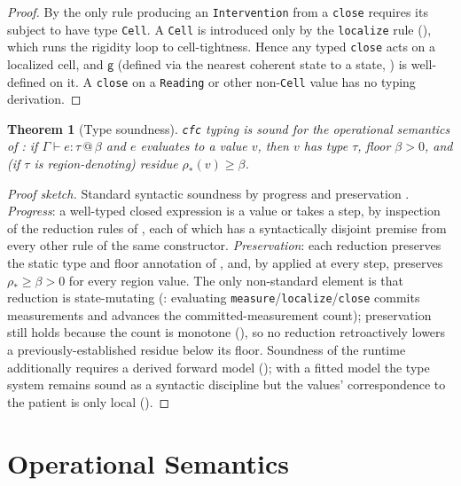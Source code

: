 \documentclass[11pt,a4paper]{article}
\theoremstyle{cfcthm}
\newtheorem{theorem}{Theorem}[section]
\theoremstyle{definition}
\theoremstyle{remark}
\newcommand{\flo}{\beta}                %
\newcommand{\Rd}{\rho}                  %
\newcommand{\gap}{\mathsf{g}}           %
\newcommand{\cf}[1]{\texttt{#1}}
\begin{document}
\begin{proof}
By  the only rule producing an \cf{Intervention} from a
\cf{close} requires its subject to have type \cf{Cell}. A \cf{Cell} is
introduced only by the \cf{localize} rule (), which runs
the rigidity loop to cell-tightness. Hence any typed \cf{close} acts on a
localized cell, and $\gap$ (defined via the nearest coherent state to a state,
) is well-defined on it. A \cf{close} on a \cf{Reading} or other
non-\cf{Cell} value has no typing derivation.
\end{proof}

\begin{theorem}[Type soundness]
\label{thm:soundness}
\cf{cfc} typing is sound for the operational semantics of : if
$\Gamma\vdash e:\tau\,@\,\flo$ and $e$ evaluates to a value $v$, then $v$ has
type $\tau$, floor $\flo>0$, and (if $\tau$ is region-denoting) residue
$\Rd_{\ast}(v)\ge\flo$.
\end{theorem}

\begin{proof}[Proof sketch]
Standard syntactic soundness by progress and preservation
\citep{wright1994syntactic,pierce2002types}. \emph{Progress}: a well-typed
closed expression is a value or takes a step, by inspection of the reduction
rules of , each of which has a syntactically disjoint premise
from every other rule of the same constructor. \emph{Preservation}: each
reduction preserves the static type and floor annotation of
, and, by  applied at every step,
preserves $\Rd_{\ast}\ge\flo>0$ for every region value. The only non-standard
element is that reduction is state-mutating (: evaluating
\cf{measure}/\cf{localize}/\cf{close} commits measurements and advances the
committed-measurement count); preservation still holds because the count is
monotone (), so no reduction retroactively lowers a
previously-established residue below its floor. Soundness of the runtime
additionally requires a derived forward model (); with a
fitted model the type system remains sound as a syntactic discipline but the
values' correspondence to the patient is only local ().
\end{proof}

\section{Operational Semantics}
\label{sec:opsem}
\end{document}
